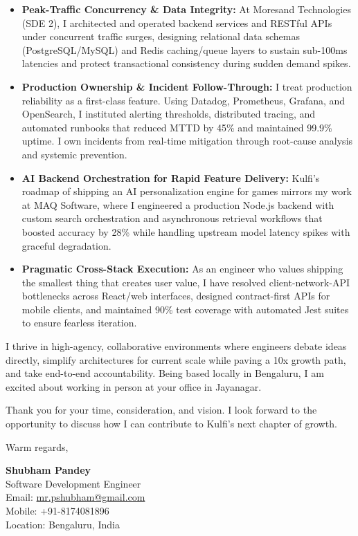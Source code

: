 \documentclass[a4paper,10pt]{article}
\begin{document}
\begin{itemize}[leftmargin=12pt, itemsep=4pt, parsep=0pt]
  \item \textbf{Peak-Traffic Concurrency \& Data Integrity:} At Moresand Technologies (SDE 2), I architected and operated backend services and RESTful APIs under concurrent traffic surges, designing relational data schemas (PostgreSQL/MySQL) and Redis caching/queue layers to sustain sub-100ms latencies and protect transactional consistency during sudden demand spikes.
  \item \textbf{Production Ownership \& Incident Follow-Through:} I treat production reliability as a first-class feature. Using Datadog, Prometheus, Grafana, and OpenSearch, I instituted alerting thresholds, distributed tracing, and automated runbooks that reduced MTTD by 45\% and maintained 99.9\% uptime. I own incidents from real-time mitigation through root-cause analysis and systemic prevention.
  \item \textbf{AI Backend Orchestration for Rapid Feature Delivery:} Kulfi's roadmap of shipping an AI personalization engine for games mirrors my work at MAQ Software, where I engineered a production Node.js backend with custom search orchestration and asynchronous retrieval workflows that boosted accuracy by 28\% while handling upstream model latency spikes with graceful degradation.
  \item \textbf{Pragmatic Cross-Stack Execution:} As an engineer who values shipping the smallest thing that creates user value, I have resolved client-network-API bottlenecks across React/web interfaces, designed contract-first APIs for mobile clients, and maintained 90\% test coverage with automated Jest suites to ensure fearless iteration.
\end{itemize}

\vspace{6pt}
I thrive in high-agency, collaborative environments where engineers debate ideas directly, simplify architectures for current scale while paving a 10x growth path, and take end-to-end accountability. Being based locally in Bengaluru, I am excited about working in person at your office in Jayanagar.

\vspace{6pt}
Thank you for your time, consideration, and vision. I look forward to the opportunity to discuss how I can contribute to Kulfi's next chapter of growth.

\vspace{12pt}
Warm regards,

\vspace{6pt}
\textbf{Shubham Pandey} \\
Software Development Engineer \\
Email: \href{mailto:mr.pshubham@gmail.com}{mr.pshubham@gmail.com} \\
Mobile: +91-8174081896 \\
Location: Bengaluru, India
\end{document}
